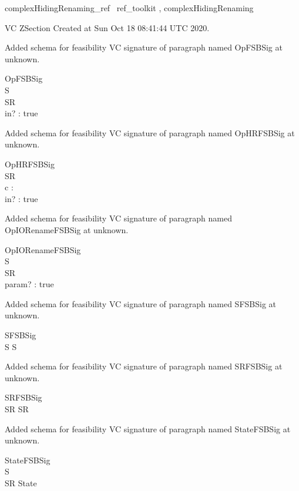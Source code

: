 \documentclass{article}
\begin{document}

\begin{zsection}	 \SECTION complexHidingRenaming\_ref \parents~ref\_toolkit , complexHidingRenaming
\end{zsection}

VC ZSection Created at Sun Oct 18 08:41:44 UTC 2020.


Added schema for feasibility VC signature of paragraph named OpFSBSig at unknown.
\begin{schema}{OpFSBSig}
\\
 S \\
 SR \\
 in? : \nat 
\where
 true
\end{schema}


Added schema for feasibility VC signature of paragraph named OpHRFSBSig at unknown.
\begin{schema}{OpHRFSBSig}
\\
 SR \\
 c : \nat \\
 in? : \nat 
\where
 true
\end{schema}


Added schema for feasibility VC signature of paragraph named OpIORenameFSBSig at unknown.
\begin{schema}{OpIORenameFSBSig}
\\
 S \\
 SR \\
 param? : \nat 
\where
 true
\end{schema}


Added schema for feasibility VC signature of paragraph named SFSBSig at unknown.
\begin{schema}{SFSBSig}
\\
 S 
\where
 S
\end{schema}


Added schema for feasibility VC signature of paragraph named SRFSBSig at unknown.
\begin{schema}{SRFSBSig}
\\
 SR 
\where
 SR
\end{schema}


Added schema for feasibility VC signature of paragraph named StateFSBSig at unknown.
\begin{schema}{StateFSBSig}
\\
 S \\
 SR 
\where
 State
\end{schema}
\end{document}
